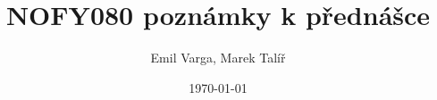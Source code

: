 \documentclass{article}
\title{NOFY080 poznámky k přednášce}
\author{Emil Varga, Marek Talíř}
\date{\today}
\newcommand{\ls}[1]{\lstinline{#1}}
\begin{document}
\maketitle

\tableofcontents
\listofintermezzos
\lstlistoflistings







% 
% 
% 



\newpage
\appendix

\end{document}

